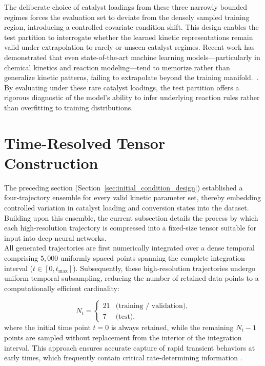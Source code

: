 \documentclass{dissertation}
\begin{document}
The deliberate choice of catalyst loadings from these three narrowly bounded regimes forces the evaluation set to deviate from the densely sampled training region, introducing a controlled covariate condition shift. This design enables the test partition to interrogate whether the learned kinetic representations remain valid  under extrapolation to rarely or unseen catalyst regimes. Recent work has demonstrated that even state-of-the-art machine learning models—particularly in chemical kinetics and reaction modeling—tend to memorize rather than generalize kinetic patterns, failing to extrapolate beyond the training manifold.~\cite{Guo2024}. By evaluating under these rare catalyst loadings, the test partition offers a rigorous diagnostic of the model’s ability to infer underlying reaction rules rather than overfitting to training distributions.\\ 

\section{Time-Resolved Tensor Construction}
\label{sec:time_resolved_tensor_construction}

The preceding section (Section~\ref{sec:initial_condition_design}) established a four‑trajectory ensemble for every valid kinetic parameter set, thereby embedding controlled variation in catalyst loading and conversion states into the dataset. Building upon this ensemble, the current subsection details the process by which each high-resolution trajectory is compressed into a fixed-size tensor suitable for input into deep neural networks.\\

All generated trajectories are first numerically integrated over a dense temporal comprising $5{,}000$ uniformly spaced points spanning the complete integration interval ($t \in [0, t_{\max}]$). Subsequently, these high-resolution trajectories undergo uniform temporal subsampling, reducing the number of retained data points to a computationally efficient cardinality:

\begin{equation}
N_t=
\begin{cases}
21 & \text{(training / validation)},\\[4pt]
7  & \text{(test)},
\end{cases}
\end{equation}
where the initial time point $t=0$ is always retained, while the remaining $N_t-1$ points are sampled without replacement from the interior of the integration interval. This approach ensures accurate capture of rapid transient behaviors at early times, which frequently contain critical rate-determining information \cite{Goodwin2017}.\\
\end{document}
